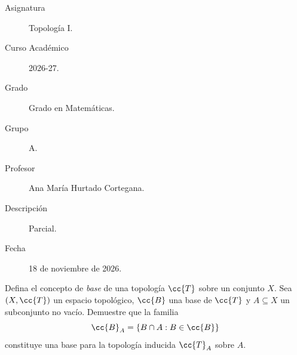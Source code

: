 \documentclass[12pt]{article}
\begin{document}

    
    

    \begin{description}
        \item[Asignatura] Topología I.
        \item[Curso Académico] 2026-27.
        \item[Grado] Grado en Matemáticas.
        \item[Grupo] A.
        \item[Profesor] Ana María Hurtado Cortegana.
        \item[Descripción] Parcial.
        \item[Fecha] 18 de noviembre de 2026.
    
    \end{description}
    \newpage

    \begin{ejercicio} Defina el concepto de \emph{base} de una topología $\cc{T}$ sobre un conjunto $X$.
    Sea $(X, \cc{T})$ un espacio topológico, $\cc{B}$ una base de $\cc{T}$ y $A \subseteq X$ un subconjunto no vacío. Demuestre que la familia
    \[
        \cc{B}_A = \{ B \cap A : B \in \cc{B} \}
    \]
    constituye una base para la topología inducida $\cc{T}_A$ sobre $A$.
    \end{ejercicio}
\end{document}
